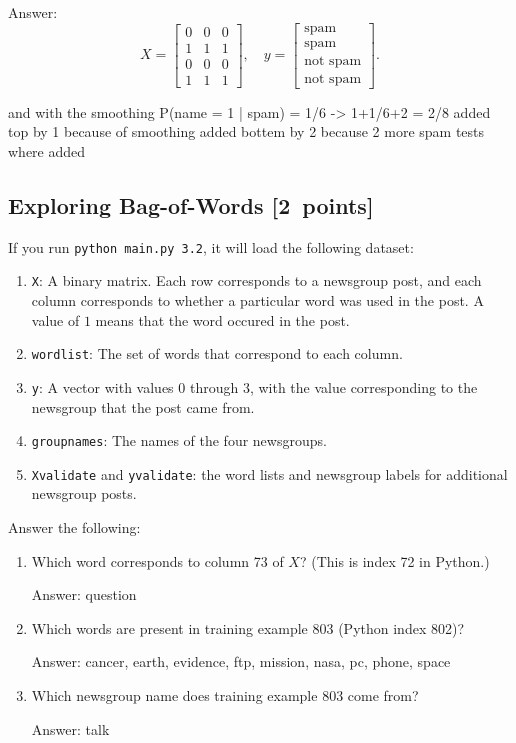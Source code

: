 \documentclass{article}
\newcommand{\blu}[1]{{\textcolor{blu}{#1}}}
\newcommand{\gre}[1]{\textcolor{gre}{#1}}
\newcommand\ans[1]{\par\gre{Answer: #1}}
\let\ask\blu
\newcommand\pts[1]{\textcolor{pointscolour}{[#1~points]}}
\begin{document}

    \ans{
        \[
    X = \begin{bmatrix}
        0 & 0 & 0\\
        1 & 1 & 1\\
        0 & 0 & 0\\
        1 & 1 & 1
    \end{bmatrix},
    \quad y = \begin{bmatrix}
        \text{spam}\\
        \text{spam}\\
        \text{not spam}\\
        \text{not spam}
    \end{bmatrix}.
    \]

    and with the smoothing P(name = 1 | spam) = 1/6 -> 1+1/6+2 = 2/8
    added top by 1 because of smoothing
    added bottem by 2 because 2 more spam tests where added
    }

    \clearpage
    \subsection{Exploring Bag-of-Words \pts{2}}

    If you run \texttt{python main.py 3.2}, it will load the following dataset:
    \begin{enumerate}
        \item \texttt{X}: A binary matrix. Each row corresponds to a newsgroup post, and each column corresponds to whether a particular word was used in the post. A value of $1$ means that the word occured in the post.
        \item \texttt{wordlist}: The set of words that correspond to each column.
        \item \texttt{y}: A vector with values $0$ through $3$, with the value corresponding to the newsgroup that the post came from.
        \item \texttt{groupnames}: The names of the four newsgroups.
        \item \texttt{Xvalidate} and \texttt{yvalidate}: the word lists and newsgroup labels for additional newsgroup posts.
    \end{enumerate}
    \ask{Answer the following}:
    \begin{enumerate}
        \item Which word corresponds to column 73 of $X$? (This is index 72 in Python.)
        \ans{question}
        \item Which words are present in training example 803 (Python index 802)?
        \ans{cancer, earth, evidence, ftp, mission, nasa, pc, phone, space}
        \item Which newsgroup name does training example 803 come from?
        \ans{talk}
    \end{enumerate}
\end{document}
